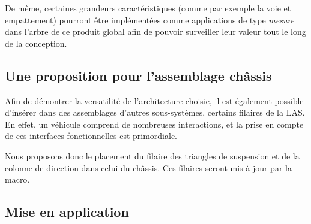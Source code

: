De même, certaines grandeurs caractéristiques (comme par exemple la voie et empattement) pourront être implémentées comme applications de type \textit{mesure} dans l'arbre de ce produit global afin de pouvoir surveiller leur valeur tout le long de la conception. 


\subsection{Une proposition pour l'assemblage châssis} %

\par Afin de démontrer la versatilité de l'architecture choisie, il est également possible d'insérer dans des assemblages d'autres sous-systèmes, certains filaires de la LAS. 
En effet, un véhicule comprend de nombreuses interactions, et la prise en compte de ces interfaces fonctionnelles est primordiale.

\par Nous proposons donc le placement du filaire des triangles de suspension et de la colonne de direction dans celui du châssis. Ces filaires seront mis à jour par la macro.

\subsection{Mise en application}

